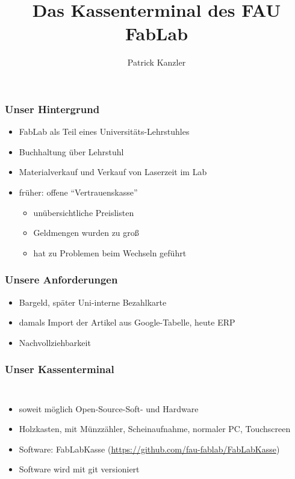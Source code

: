 \documentclass[german]{beamer} %
\title{Das Kassenterminal des FAU FabLab}
\author{Patrick Kanzler}
\newcommand{\images}{kassenterminal/}
\begin{document}

\maketitle




\begin{frame}
\frametitle{Unser Hintergrund}
\begin{itemize}
 \item FabLab als Teil eines Universitäts-Lehrstuhles
 \item Buchhaltung über Lehrstuhl
 \item Materialverkauf und Verkauf von Laserzeit im Lab
 \item früher: offene \enquote{Vertrauenskasse}
   \begin{itemize}
   	\item unübersichtliche Preislisten
   	\item Geldmengen wurden zu groß
    \item hat zu Problemen beim Wechseln geführt
   \end{itemize} 	
\end{itemize}	 
\end{frame}

\begin{frame}
\frametitle{Unsere Anforderungen}
 \begin{itemize}
 	\item Bargeld, später Uni-interne Bezahlkarte
 	\item damals Import der Artikel aus Google-Tabelle, heute ERP
	\item Nachvollziehbarkeit
 \end{itemize}
\end{frame}

\begin{frame}
\frametitle{Unser Kassenterminal}
\begin{columns}[c]
 \begin{itemize}
 \item soweit möglich Open-Source-Soft- und Hardware
 \item Holzkasten, mit Münzzähler, Scheinaufnahme, normaler PC, Touchscreen
 \item Software: FabLabKasse (\url{https://github.com/fau-fablab/FabLabKasse})
 \item Software wird mit git versioniert
 \end{itemize}
 \end{columns}
\end{frame}
\end{document}
